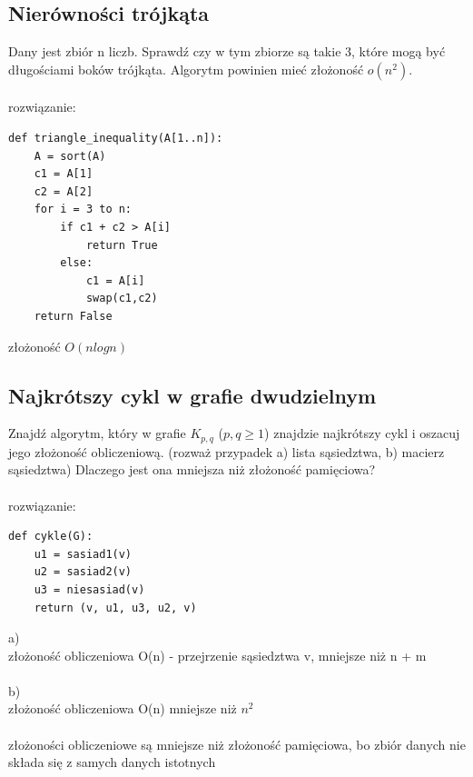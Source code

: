 \documentclass{article}
\begin{document}
\subsection*{Nierówności trójkąta}
Dany jest zbiór n liczb. Sprawdź czy w tym zbiorze są takie 3, które mogą być długościami boków trójkąta. Algorytm powinien mieć złożoność $o(n^2)$. \\\\rozwiązanie:\\
\begin{lstlisting}
def triangle_inequality(A[1..n]):
	A = sort(A)
	c1 = A[1]
	c2 = A[2]
	for i = 3 to n:
		if c1 + c2 > A[i]
			return True
		else:
			c1 = A[i]
			swap(c1,c2)			
	return False

\end{lstlisting}
złożoność $O(nlogn)$

\subsection*{Najkrótszy cykl w grafie dwudzielnym}
Znajdź algorytm,  który w grafie $K_{p,q}$ ($p,q \ge 1$) znajdzie najkrótszy cykl i oszacuj jego złożoność obliczeniową.  
(rozważ przypadek a) lista sąsiedztwa, b) macierz sąsiedztwa)
Dlaczego jest ona mniejsza niż złożoność pamięciowa? \\\\rozwiązanie:\\
\begin{lstlisting}
def cykle(G):
	u1 = sasiad1(v)
	u2 = sasiad2(v)
	u3 = niesasiad(v)
	return (v, u1, u3, u2, v)
\end{lstlisting}
a)\\
złożoność obliczeniowa O(n) - przejrzenie sąsiedztwa v,  mniejsze niż n + m \\\\
b)\\
złożoność obliczeniowa O(n) mniejsze niż $n^2$ \\\\
złożoności obliczeniowe są mniejsze niż złożoność pamięciowa, bo zbiór danych nie składa się z samych danych istotnych
\end{document}
